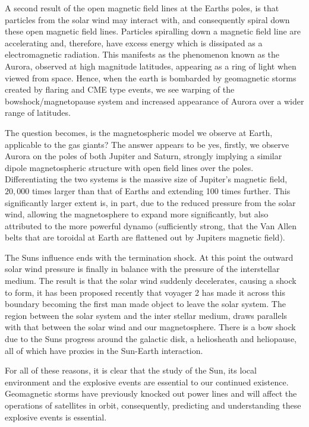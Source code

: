 A second result of the open magnetic field lines at the Earths poles, is that particles from the solar wind may interact with, and consequently spiral down these open magnetic field lines.
Particles spiralling down a magnetic field line are accelerating and, therefore, have excess energy which is dissipated as a electromagnetic radiation.
This manifests as the phenomenon known as the Aurora, observed at high magnitude latitudes, appearing as a ring of light when viewed from space.
Hence, when the earth is bombarded by geomagnetic storms created by flaring and CME type events, we see warping of the bowshock/magnetopause system and increased appearance of Aurora over a wider range of latitudes.

The question becomes, is the magnetospheric model we observe at Earth, applicable to the gas giants?
The answer appears to be yes, firstly, we observe Aurora on the poles of both Jupiter and Saturn, strongly implying a similar dipole magnetospheric structure with open field lines over the poles.
Differentiating the two systems is the massive size of Jupiter's magnetic field, $20,000$ times larger than that of Earths and extending 100 times further.
This significantly larger extent is, in part, due to the reduced pressure from the solar wind, allowing the magnetosphere to expand more significantly, but also attributed to the more powerful dynamo (sufficiently strong, that the Van Allen belts that are toroidal at Earth are flattened out by Jupiters magnetic field).

The Suns influence ends with the termination shock.
At this point the outward solar wind pressure is finally in balance with the pressure of the interstellar medium.
The result is that the solar wind suddenly decelerates, causing a shock to form, it has been proposed recently that voyager 2 has made it across this boundary becoming the first man made object to leave the solar system.
The region between the solar system and the inter stellar medium, draws parallels with that between the solar wind and our magnetosphere.
There is a bow shock due to the Suns progress around the galactic disk, a heliosheath and heliopause, all of which have proxies in the Sun-Earth interaction.

For all of these reasons, it is clear that the study of the Sun, its local environment and the explosive events are essential to our continued existence.
Geomagnetic storms have previously knocked out power lines and will affect the operations of satellites in orbit, consequently, predicting and understanding these explosive events is essential.

